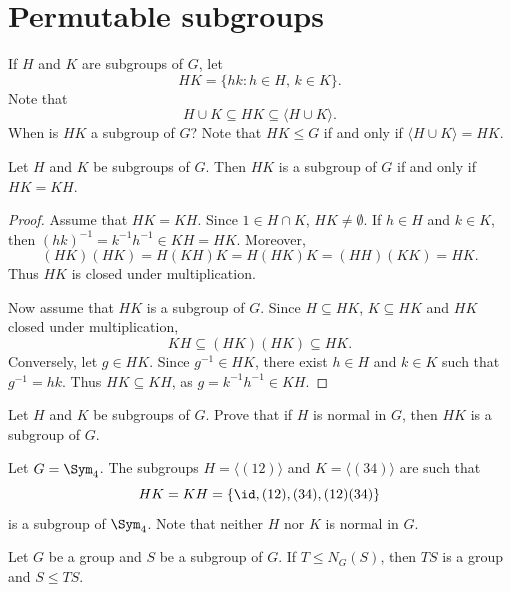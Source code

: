 
\section{Permutable subgroups}

If $H$ and $K$ are subgroups of $G$, let 
\[
        HK=\{hk:h\in H,\,k\in K\}.
\]
Note that 
\[
H\cup K\subseteq HK\subseteq\langle H\cup K\rangle.
\]
When is $HK$ a subgroup of $G$? 
Note that $HK\leq G$ if and only if $\langle H\cup K\rangle=HK$.

\begin{proposition}
        Let $H$ and $K$ be subgroups of $G$. Then $HK$ is a subgroup of
        $G$ if and only if $HK=KH$.
\end{proposition}

\begin{proof}
    Assume that $HK=KH$. Since $1\in H\cap K$, $HK\ne\emptyset$. 
    If $h\in H$ and $k\in K$, then $(hk)^{-1}=k^{-1}h^{-1}\in KH=HK$. Moreover, 
    \[
    (HK)(HK)=H(KH)K=H(HK)K=(HH)(KK)=HK.
    \]
    Thus $HK$ is closed under multiplication. 

    Now assume that $HK$ is a subgroup of $G$. Since $H\subseteq HK$,
    $K\subseteq HK$ and $HK$ closed under multiplication,
        \[
        KH\subseteq (HK)(HK)\subseteq HK.
        \]
        Conversely, let $g\in HK$.
        Since $g^{-1}\in HK$, there exist $h\in H$ and $k\in K$ such that
        $g^{-1}=hk$.
        Thus $HK\subseteq KH$, as 
        $g=k^{-1}h^{-1}\in KH$.
\end{proof}

\begin{exercise}
\label{xca:HK_normal}
Let $H$ and $K$ be subgroups of $G$. Prove that 
if $H$ is normal in $G$, then $HK$ is a subgroup of $G$.
\end{exercise}

\begin{example}
Let $G=\Sym_4$. The subgroups $H=\langle (12)\rangle$ and $K=\langle (34)\rangle$ are such that 
\[
HK=KH=\{
\id,(12),(34),(12)(34)\}
\]
is a subgroup of 
$\Sym_4$. Note that neither $H$ nor $K$
is normal in $G$.
\end{example}

\begin{exercise}
Let $G$ be a group and $S$ be a subgroup of $G$. 
If $T\leq N_G(S)$, then $TS$ is a group and $S\leq TS$.
\end{exercise}

